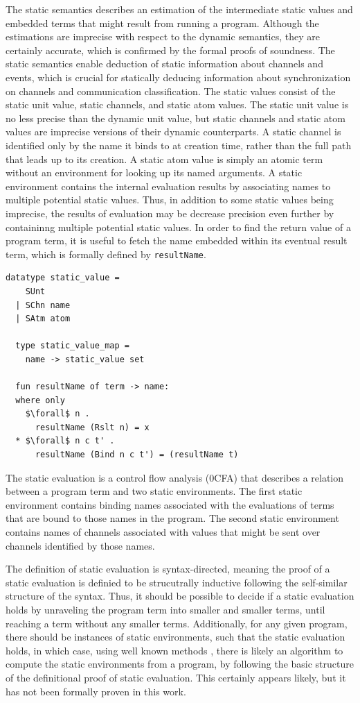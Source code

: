 \documentclass[letterpaper, 11pt]{extarticle}
\begin{document}
The static semantics describes an estimation of the intermediate static values and embedded terms
that might result from running a program.  Although the estimations are imprecise with
respect to the dynamic semantics, they are certainly accurate,
which is confirmed by the formal proofs of soundness.
The static semantics enable deduction of static information about channels and events, which is
crucial for statically deducing information about synchronization on channels and
communication classification.
The static values consist of the static unit value, static channels, and static atom
values. The static unit value is no less precise than the dynamic unit value, but
static channels and static atom values are imprecise versions of their dynamic
counterparts. A static channel is identified only by the name it binds to at creation time,
rather than the full path that leads up to its creation.  A static atom value is simply an
atomic term without an environment for looking up its named arguments.  A static
environment contains the internal evaluation results by
associating names to multiple potential static values.
Thus, in addition to some static values being imprecise,
the results of evaluation may be decrease precision even further
by containinng multiple potential static values. 
In order to find the return value of a program term, it is useful to fetch the name
embedded within its eventual result term, which is formally defined by \lstinline{resultName}.

\begin{lstlisting}[language=logic, mathescape]
  datatype static_value =
    SUnt
  | SChn name
  | SAtm atom 

  type static_value_map =
    name -> static_value set

  fun resultName of term -> name:
  where only
    $\forall$ n .
      resultName (Rslt n) = x
  * $\forall$ n c t' . 
      resultName (Bind n c t') = (resultName t)
\end{lstlisting}

The static evaluation is a control flow analysis (0CFA)
that describes a relation between a program term and two static environments.
The first static environment contains binding names associated with the
evaluations of terms that are bound to those names in the program.
The second static environment contains names of channels associated
with values that might be sent over channels identified by those names.

The definition of static evaluation is syntax-directed, meaning the proof of a static evaluation
is definied to be strucutrally inductive following the self-similar structure of the syntax.
Thus, it should be possible to decide if a static evaluation holds
by unraveling the program term into smaller and smaller terms,
until reaching a term without any smaller terms.
Additionally, for any given program, there should be instances of static environments,
such that the static evaluation holds, in which case, using well known methods \cite{},
there is likely an algorithm to compute the static environments from a program,
by following the basic structure of the definitional proof of static evaluation.
This certainly appears likely, but it has not been formally proven in this work.
\end{document}
